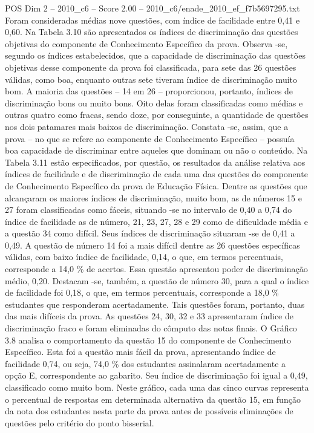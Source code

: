 \begin{textsample}{POS Dim 2 – 2010\_c6 – Score 2.00 – 2010\_c6/enade\_2010\_ef\_f7b5697295.txt}
Foram consideradas médias nove questões, com índice de facilidade entre 0,41 e 0,60.
Na Tabela 3.10 são apresentados os índices de discriminação das questões objetivas do componente de Conhecimento Específico da prova.
Observa -se, segundo os índices estabelecidos, que a capacidade de discriminação das questões objetivas desse componente da prova foi classificada, para sete das 26 questões válidas, como boa, enquanto outras sete tiveram índice de discriminação muito bom.
A maioria das questões – 14 em 26 – proporcionou, portanto, índices de discriminação bons ou muito bons.
Oito delas foram classificadas como médias e outras quatro como fracas, sendo doze, por conseguinte, a quantidade de questões nos dois patamares mais baixos de discriminação.
Constata -se, assim, que a prova – no que se refere ao componente de Conhecimento Específico – possuía boa capacidade de discriminar entre aqueles que dominam ou não o conteúdo.
Na Tabela 3.11 estão especificados, por questão, os resultados da análise relativa aos índices de facilidade e de discriminação de cada uma das questões do componente de Conhecimento Específico da prova de Educação Física.
Dentre as questões que alcançaram os maiores índices de discriminação, muito bom, as de números 15 e 27 foram classificadas como fáceis, situando -se no intervalo de 0,40 a 0,74 do índice de facilidade as de número, 21, 23, 27, 28 e 29 como de dificuldade média e a questão 34 como difícil.
Seus índices de discriminação situaram -se de 0,41 a 0,49.
A questão de número 14 foi a mais difícil dentre as 26 questões específicas válidas, com baixo índice de facilidade, 0,14, o que, em termos percentuais, corresponde a 14,0 \% de acertos.
Essa questão apresentou poder de discriminação médio, 0,20.
Destacam -se, também, a questão de número 30, para a qual o índice de facilidade foi 0,18, o que, em termos percentuais, corresponde a 18,0 \% estudantes que responderam acertadamente.
Tais questões foram, portanto, duas das mais difíceis da prova.
As questões 24, 30, 32 e 33 apresentaram índice de discriminação fraco e foram eliminadas do cômputo das notas finais.
O Gráfico 3.8 analisa o comportamento da questão 15 do componente de Conhecimento Específico.
Esta foi a questão mais fácil da prova, apresentando índice de facilidade 0,74, ou seja, 74,0 \% dos estudantes assinalaram acertadamente a opção E, correspondente ao gabarito.
Seu índice de discriminação foi igual a 0,49, classificado como muito bom.
Neste gráfico, cada uma das cinco curvas representa o percentual de respostas em determinada alternativa da questão 15, em função da nota dos estudantes nesta parte da prova antes de possíveis eliminações de questões pelo critério do ponto bisserial.

\end{textsample}
